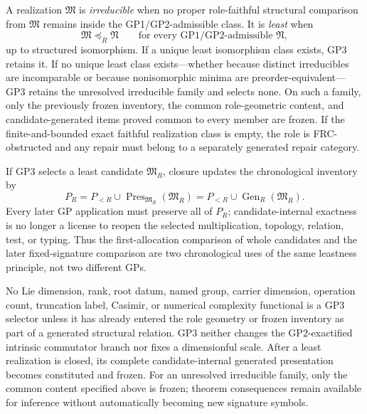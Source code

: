 \documentclass[12pt,a4paper]{article}
\begin{document}
\begin{mdframed}[style=postulatebox,nobreak=false]
\begin{postulate}
A realization \(\mathfrak M\) is \emph{irreducible} when no proper
role-faithful structural comparison from \(\mathfrak M\) remains inside the
GP1/GP2-admissible class.  It is \emph{least} when
\[
 \mathfrak M\preceq_R\mathfrak N
 \qquad\text{for every GP1/GP2-admissible }\mathfrak N,
\]
up to structured isomorphism.  If a unique least isomorphism class exists, GP3
retains it.  If no unique least class exists---whether because distinct
irreducibles are incomparable or because nonisomorphic minima are
preorder-equivalent---GP3 retains the unresolved irreducible family and
selects none.  On such a family, only the previously frozen inventory, the
common role-geometric content, and candidate-generated items proved common to
every member are frozen.  If the finite-and-bounded exact
faithful realization class is empty, the role is FRC-obstructed and any repair
must belong to a separately generated repair category.

If GP3 selects a least candidate \(\mathfrak M_R\), closure updates the
chronological inventory by
\[
 P_R=P_{<R}\cup
 \operatorname{Pres}_{\mathfrak M_R}(\mathfrak M_R)
 =P_{<R}\cup\operatorname{Gen}_R(\mathfrak M_R).
\]
Every later GP application must preserve all of \(P_R\); candidate-internal
exactness is no longer a license to reopen the selected multiplication,
topology, relation, test, or typing.  Thus the first-allocation comparison of
whole candidates and the later fixed-signature comparison are two chronological
uses of the same leastness principle, not two different GPs.

No Lie dimension, rank, root datum, named group, carrier dimension, operation
count, truncation label, Casimir, or numerical complexity functional is a GP3
selector unless it has already entered the role geometry or frozen inventory
as part of a generated structural relation.  GP3 neither changes the
GP2-exactified intrinsic commutator branch nor fixes a dimensionful scale.
After a least realization is closed, its complete candidate-internal generated
presentation becomes constituted and frozen.  For an unresolved irreducible
family, only the common content specified above is frozen; theorem
consequences remain available for inference without automatically becoming new
signature symbols.
\end{postulate}
\end{mdframed}
\end{document}

